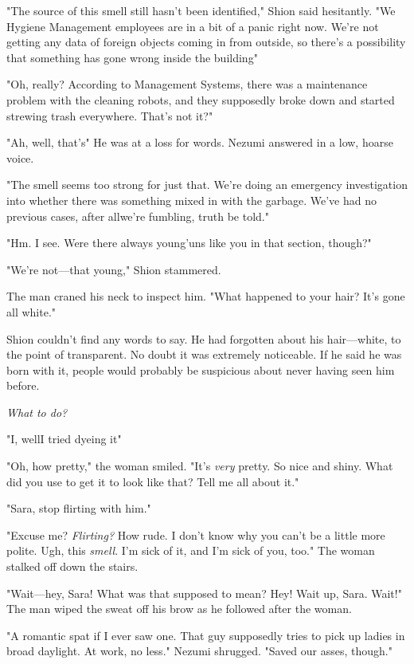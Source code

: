 "The source of this smell still hasn't been identified," Shion said
hesitantly. "We Hygiene Management employees are in a bit of a panic
right now. We're not getting any data of foreign objects coming in from
outside, so there's a possibility that something has gone wrong inside
the building\el "

"Oh, really? According to Management Systems, there was a maintenance
problem with the cleaning robots, and they supposedly broke down and
started strewing trash everywhere. That's not it?"

"Ah, well, that's\el " He was at a loss for words. Nezumi answered in a
low, hoarse voice.

"The smell seems too strong for just that. We're doing an emergency
investigation into whether there was something mixed in with the
garbage. We've had no previous cases, after all\el we're fumbling, truth
be told."

"Hm. I see. Were there always young'uns like you in that section,
though?"

"We're not---that young," Shion stammered.

The man craned his neck to inspect him. "What happened to your hair?
It's gone all white."

Shion couldn't find any words to say. He had forgotten about his
hair---white, to the point of transparent. No doubt it was extremely
noticeable. If he said he was born with it, people would probably be
suspicious about never having seen him before.

\emph{What to do?}

"I, well\el I tried dyeing it\el "

"Oh, how pretty," the woman smiled. "It's \emph{very} pretty. So nice and
shiny. What did you use to get it to look like that? Tell me all about
it."

"Sara, stop flirting with him."

"Excuse me? \emph{Flirting?} How rude. I don't know why you can't be a little
more polite. Ugh, this \emph{smell}. I'm sick of it, and I'm sick of you, too."
The woman stalked off down the stairs.

"Wait---hey, Sara! What was that supposed to mean? Hey! Wait up, Sara.
Wait!" The man wiped the sweat off his brow as he followed after the woman.

"A romantic spat if I ever saw one. That guy supposedly tries to pick up
ladies in broad daylight. At work, no less." Nezumi shrugged. "Saved our
asses, though."

